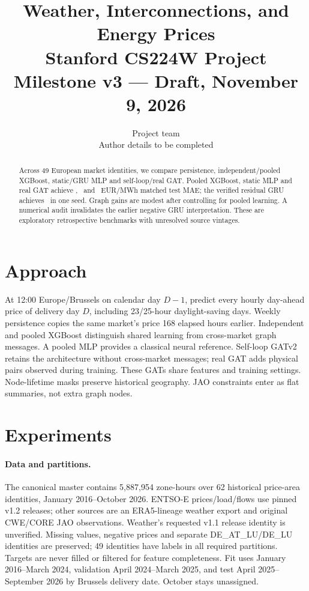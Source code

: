 \documentclass{article}
\title{Weather, Interconnections, and Energy Prices\\
  \small\normalfont Stanford CS224W Project Milestone v3 --- Draft, November 9, 2026}
\author{Project team\\\small Author details to be completed}
\begin{document}
\maketitle
\begin{abstract}
Across 49 European market identities, we compare persistence, independent/pooled
XGBoost, static/GRU MLP and self-loop/real GAT. Pooled XGBoost, static MLP and real
GAT achieve \PooledTest, \MlpTest\ and \GatTest\ EUR/MWh matched test MAE;
the verified residual GRU achieves \GruTest\ in one seed. Graph gains are modest
after controlling for pooled learning. A numerical audit invalidates the earlier
negative GRU interpretation. These are exploratory retrospective benchmarks with
unresolved source vintages.
\end{abstract}

\section{Approach}
At 12:00 Europe/Brussels on calendar day $D-1$, predict every hourly day-ahead
price of delivery day $D$, including 23/25-hour daylight-saving days. Weekly
persistence copies the same market's price 168 elapsed hours earlier.
Independent and pooled XGBoost \cite{chen} distinguish shared learning from
cross-market graph messages. A pooled MLP provides a classical neural reference.
Self-loop GATv2 \cite{gat} retains the architecture without cross-market messages;
real GAT adds physical pairs observed during training. These GATs share features
and training settings. Node-lifetime masks preserve historical geography.
JAO constraints enter as flat summaries, not extra graph nodes.

\section{Experiments}
\paragraph{Data and partitions.}
The canonical master contains 5,887,954 zone-hours over 62 historical price-area
identities, January 2016--October 2026. ENTSO-E prices/load/flows use pinned v1.2
releases; other sources are an ERA5-lineage weather export and original CWE/CORE
JAO observations. Weather's requested v1.1 release identity is unverified.
Missing values, negative prices and separate DE\_AT\_LU/DE\_LU identities are
preserved; 49 identities have labels in all required partitions. Targets are
never filled or filtered for feature completeness. Fit uses January 2016--March
2024, validation April 2024--March 2025, and test April 2025--September 2026 by
Brussels delivery date. October stays unassigned.
\end{document}

